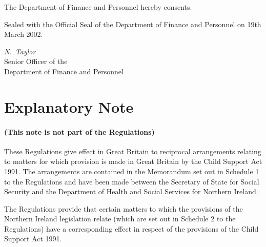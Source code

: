 \documentclass[12pt,a4paper]{article}
\begin{document}
\bigskip

The Department of Finance and Personnel hereby consents.

Sealed with the Official Seal of the Department of Finance and Personnel on 19th March 2002.

{\raggedleft
\emph{N.~Taylor}\\
Senior Officer of the\\
Department of Finance and Personnel

}

\part{Explanatory Note}

\renewcommand\parthead{--- Explanatory Note}

\subsection*{(This note is not part of the Regulations)}

 These Regulations give effect in Great Britain to reciprocal arrangements relating to matters for which provision is made in Great Britain by the Child Support Act 1991. The arrangements are contained in the Memorandum set out in Schedule 1 to the Regulations and have been made between the Secretary of State for Social Security and the Department of Health and Social Services for Northern Ireland.

  The Regulations provide that certain matters to which the provisions of the Northern Ireland legislation relate (which are set out in Schedule 2 to the Regulations) have a corresponding effect in respect of the provisions of the Child Support Act 1991.
\end{document}
